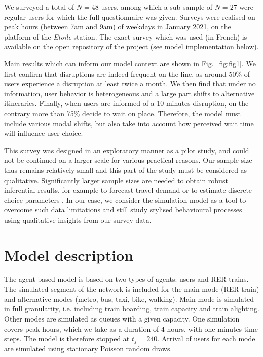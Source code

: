 \documentclass[10pt]{article}
\begin{document}
We surveyed a total of $N=48$ users, among which a sub-sample of $N=27$ were regular users for which the full questionnaire was given. Surveys were realised on peak hours (between 7am and 9am) of weekdays in January 2021, on the platform of the \emph{Etoile} station. The exact survey which was used (in French) is available on the open repository of the project (see model implementation below).

Main results which can inform our model context are shown in Fig.~\ref{fig:fig1}. We first confirm that disruptions are indeed frequent on the line, as around 50\% of users experience a disruption at least twice a month. We then find that under no information, user behavior is heterogeneous and a large part shifts to alternative itineraries. Finally, when users are informed of a 10 minutes disruption, on the contrary more than 75\% decide to wait on place. Therefore, the model must include various modal shifts, but also take into account how perceived wait time will influence user choice.

This survey was designed in an exploratory manner as a pilot study, and could not be continued on a larger scale for various practical reasons. Our sample size thus remains relatively small and this part of the study must be considered as qualitative. Significantly larger sample sizes are needed to obtain robust inferential results, for example to forecast travel demand \citep{horvath2015estimation} or to estimate discrete choice parameters \citep{bliemer2009efficiency}. In our case, we consider the simulation model as a tool to overcome such data limitations and still study stylised behavioural processes using qualitative insights from our survey data.


\section{Model description}

The agent-based model is based on two types of agents: users and RER trains. The simulated segment of the network is included for the main mode (RER train) and alternative modes (metro, bus, taxi, bike, walking). Main mode is simulated in full granularity, i.e. including train boarding, train capacity and train alighting. Other modes are simulated as queues with a given capacity. One simulation covers peak hours, which we take as a duration of 4 hours, with one-minutes time steps. The model is therefore stopped at $t_f = 240$. Arrival of users for each mode are simulated using stationary Poisson random draws.
\end{document}
